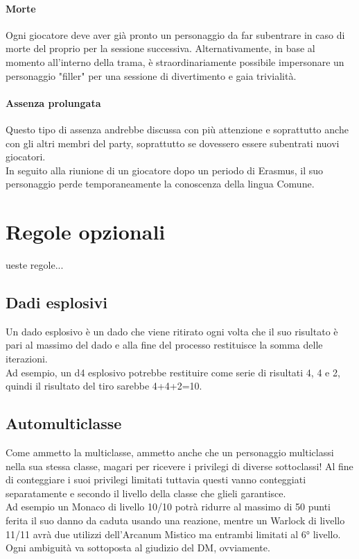 \paragraph{Morte}

Ogni giocatore deve aver già pronto un personaggio da far subentrare in caso di morte del proprio per la sessione successiva. Alternativamente, in base al momento all'interno della trama, è straordinariamente possibile impersonare un personaggio "filler" per una sessione di divertimento e gaia trivialità.

\paragraph{Assenza prolungata}

Questo tipo di assenza andrebbe discussa con più attenzione e soprattutto anche con gli altri membri del party, soprattutto se dovessero essere subentrati nuovi giocatori. \\ In seguito alla riunione di un giocatore dopo un periodo di Erasmus, il suo personaggio perde temporaneamente la conoscenza della lingua Comune.

\section{Regole opzionali}

ueste regole...

\subsection{Dadi esplosivi}

Un dado esplosivo è un dado che viene ritirato ogni volta che il suo risultato è pari al massimo del dado e alla fine del processo restituisce la somma delle iterazioni. \\ Ad esempio, un d4 esplosivo potrebbe restituire come serie di risultati 4, 4 e 2, quindi il risultato del tiro sarebbe 4+4+2=10.

\subsection{Automulticlasse}

Come ammetto la multiclasse, ammetto anche che un personaggio multiclassi nella sua stessa classe, magari per ricevere i privilegi di diverse sottoclassi! Al fine di conteggiare i suoi privilegi limitati tuttavia questi vanno conteggiati separatamente e secondo il livello della classe che glieli garantisce. \\ Ad esempio un Monaco di livello 10/10 potrà ridurre al massimo di 50 punti ferita il suo danno da caduta usando una reazione, mentre un Warlock di livello 11/11 avrà due utilizzi dell'Arcanum Mistico ma entrambi limitati al 6° livello. \\ Ogni ambiguità va sottoposta al giudizio del DM, ovviamente.

